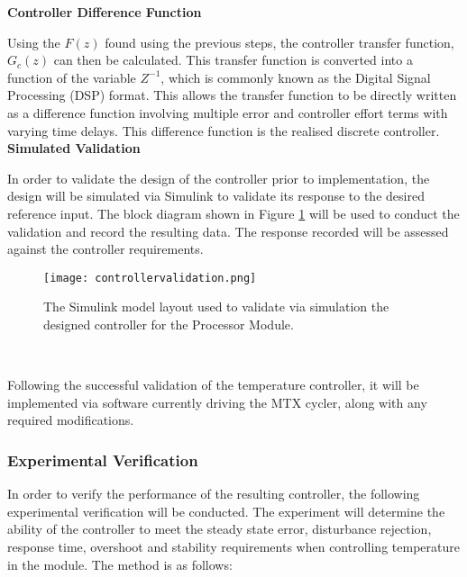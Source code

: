 \textbf{Controller Difference Function}

Using the $F(z)$ found using the previous steps, the controller transfer function, $G_c(z)$ can then be calculated. This transfer function is converted into a function of the variable $Z^{-1}$, which is commonly known as the Digital Signal Processing (DSP) format. This allows the transfer function to be directly written as a difference function involving multiple error and controller effort terms with varying time delays. This difference function is the realised discrete controller.\\

\textbf{Simulated Validation}

In order to validate the design of the controller prior to implementation, the design will be simulated via Simulink to validate its response to the desired reference input. The block diagram shown in Figure \ref{fig:controllervalidation} will be used to conduct the validation and record the resulting data. The response recorded will be assessed against the controller requirements.

\begin{figure}[!htb]
	\centering
	\texttt{[image: controllervalidation.png]}
	\caption[Controller valiation Simulink Model.]{The Simulink model layout used to validate via simulation the designed controller for the Processor Module.}
	\label{fig:controllervalidation}
\end{figure} 
\FloatBarrier

Following the successful validation of the temperature controller, it will be implemented via software currently driving the MTX cycler, along with any required modifications.


\subsubsection{Experimental Verification}

In order to verify the performance of the resulting controller, the following experimental verification will be conducted. The experiment will determine the ability of the controller to meet the steady state error, disturbance rejection, response time, overshoot and stability requirements when controlling temperature in the module. The method is as follows:

